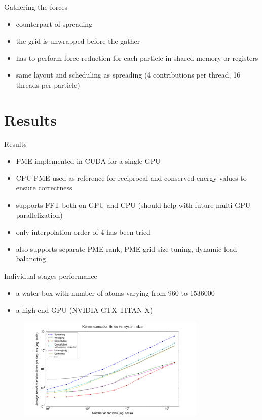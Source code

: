 \documentclass[11pt]{beamer}
\begin{document}
\begin{frame}{Gathering the forces}
\begin{itemize}
\item counterpart of spreading
\item the grid is unwrapped before the gather
\item has to perform force reduction for each particle in shared memory or registers
\item same layout and scheduling as spreading (4 contributions per thread, 16 threads per particle)
\end{itemize}
\end{frame}

\section{Results}
\begin{frame}{Results}
\begin{itemize}
\item PME implemented in CUDA for a single GPU
\item CPU PME used as reference for reciprocal and conserved energy values to ensure correctness
\item supports FFT both on GPU and CPU (should help with future multi-GPU parallelization) 
\item only interpolation order of 4 has been tried
\item also supports separate PME rank, PME grid size tuning, dynamic load balancing
\end{itemize}
\end{frame}

\begin{frame}{Individual stages performance}
\begin{itemize}
\item a water box with number of atoms varying from 960 to 1536000
\item a high end GPU (NVIDIA GTX TITAN X) 
\end{itemize}
\begin{figure}
    \includegraphics[width=0.8\textwidth]{pics/kernels-noconcur-2.png}
    \label{fig:kernels}
\end{figure}
\end{frame}
\end{document}
